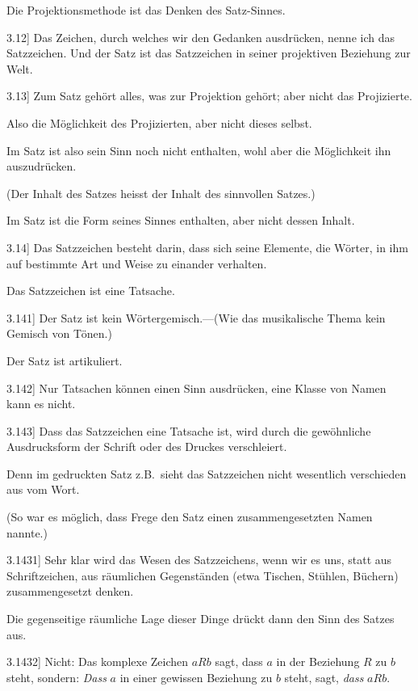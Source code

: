 \documentclass[12pt,oneside]{book}[2007/10/19]
\newcommand{\PropERef}[1]{\hyperref[PropE:#1]{#1}}
\newcommand{\PropositionG}[2]{%
  \item[\phantomsection\label{PropG:#1}\PropERef{#1}] #2%
}
\newcommand{\Emph}[1]{\emph{#1}}%
\newcommand{\zumBeispiel}{z.\;B.}
\begin{document}
\begin{propositions}
{Die Projektionsmethode ist das Denken des
Satz-Sinnes.}


\PropositionG{3.12}
{Das Zeichen, durch welches wir den Gedanken
ausdrücken, nenne ich das Satzzeichen. Und der
Satz ist das Satzzeichen in seiner projektiven
Beziehung zur Welt.}


\PropositionG{3.13}
{Zum Satz gehört alles, was zur Projektion
gehört; aber nicht das Projizierte.

Also die Möglichkeit des Projizierten, aber nicht
dieses selbst.

Im Satz ist also sein Sinn noch nicht enthalten,
wohl aber die Möglichkeit ihn auszudrücken.

(\glqq{}Der Inhalt des Satzes\grqq{} heisst der Inhalt des
sinnvollen Satzes.)

Im Satz ist die Form seines Sinnes enthalten,
aber nicht dessen Inhalt.}


\PropositionG{3.14}
{Das Satzzeichen besteht darin, dass sich seine
Elemente, die Wörter, in ihm auf bestimmte Art
und Weise zu einander verhalten.

Das Satzzeichen ist eine Tatsache.}


\PropositionG{3.141}
{Der Satz ist kein Wörtergemisch.---(Wie
das musikalische Thema kein Gemisch von
Tönen.)

Der Satz ist artikuliert.}


\PropositionG{3.142}
{Nur Tatsachen können einen Sinn ausdrücken,
eine Klasse von Namen kann es nicht.}


\PropositionG{3.143}
{Dass das Satzzeichen eine Tatsache ist, wird
durch die gewöhnliche Ausdrucksform der Schrift
oder des Druckes verschleiert.

Denn im gedruckten Satz \zumBeispiel\ sieht das Satzzeichen
nicht wesentlich verschieden aus vom
Wort.

(So war es möglich, dass Frege den Satz einen
zusammengesetzten Namen nannte.)}


\PropositionG{3.1431}
{Sehr klar wird das Wesen des Satzzeichens,
wenn wir es uns, statt aus Schriftzeichen, aus
räumlichen Gegenständen (etwa Tischen, Stühlen,
Büchern) zusammengesetzt denken.

Die gegenseitige räumliche Lage dieser Dinge
drückt dann den Sinn des Satzes aus.}


\PropositionG{3.1432}
{Nicht: \glqq{}Das komplexe Zeichen \glq{}$aRb$\grq{} sagt,
dass $a$ in der Beziehung $R$ zu $b$ steht\grqq{}, sondern:
\Emph{Dass} \glqq{}$a$\grqq{} in einer gewissen Beziehung zu \glqq{}$b$\grqq{}
steht, sagt, \Emph{dass} $aRb$.}



\end{propositions}
\end{document}
